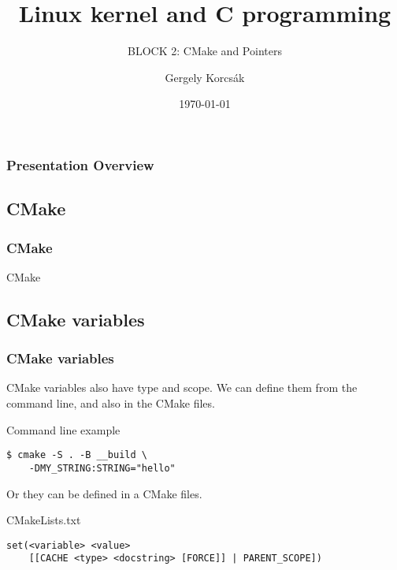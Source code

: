 \documentclass[
	11pt, %
]{beamer}
\title[Linux kernel and C programming]{Linux kernel and C programming}
\subtitle{BLOCK 2: CMake and Pointers}
\author[Gergely Korcsák]{Gergely Korcsák}
\institute[OE NIK]{Óbuda University \\ \smallskip \textit{korcsak.gergely@nik.uni-obuda.hu}}
\date[\today]{\today}
\newcommand{\sft}[1]{\section{#1}\frametitle{#1}\centering\LARGE#1}
\newcommand{\ssft}[1]{\subsection{#1}\frametitle{#1}}
\begin{document}

\begin{frame}
	\titlepage
\end{frame}


\begin{frame}
	\frametitle{Presentation Overview} %

	\tableofcontents %
\end{frame}


\begin{frame}
    \sft{CMake}
\end{frame}

\begin{frame}[fragile]
    \ssft{CMake variables}

    CMake variables also have type and scope. We can define them from the command line, and also in the CMake files.

    \begin{block}{Command line example}
        \begin{lstlisting}[style=CStyle]
$ cmake -S . -B __build \
    -DMY_STRING:STRING="hello"

\end{lstlisting}
    \end{block}

    \bigskip

    Or they can be defined in a CMake files.

    \begin{block}{CMakeLists.txt}
        \begin{lstlisting}[style=CStyle]
set(<variable> <value>
    [[CACHE <type> <docstring> [FORCE]] | PARENT_SCOPE])

\end{lstlisting}
    \end{block}

\end{frame}
\end{document}
